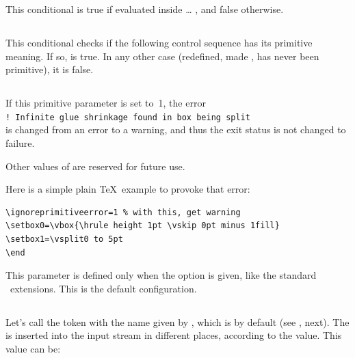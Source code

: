 \documentclass{pdftexmanual}
\begin{document}
This conditional is true if evaluated inside  \ldots
{}, and false otherwise.

\subsection{}

This conditional checks if the following control sequence has its
primitive meaning. If so,  is true. In any other case
(redefined, made , has never been primitive), it is false.

\subsection{}

If this primitive parameter is set to~1, the error\\
\verb|! Infinite glue shrinkage found in box being split|\\
is changed from an error to a warning, and thus the exit status is not
changed to failure.

Other values of  are reserved for future use.

Here is a simple plain \TeX\ example to provoke that error:

\begin{verbatim}
\ignoreprimitiveerror=1 % with this, get warning
\setbox0=\vbox{\hrule height 1pt \vskip 0pt minus 1fill}
\setbox1=\vsplit0 to 5pt
\end
\end{verbatim}

This parameter is defined only when the  option is given,
like the standard \ETEX\ extensions. This is the default configuration.


\subsection{}

Let's call  the token with the name given by
, which is  by default (see ,
next). The  is inserted into the input stream in
different places, according to the  value. This
value can be:
\end{document}
